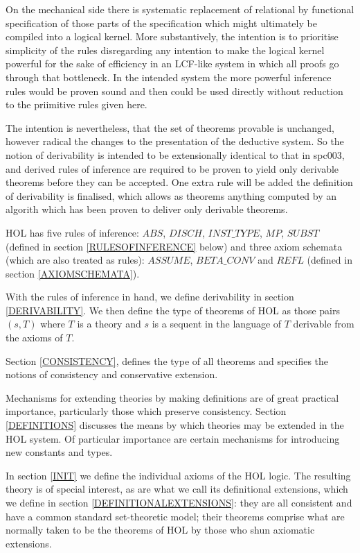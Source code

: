 \documentclass[a4paper,11pt,titlepage]{article}
\begin{document}
\begin{titlepage}
On the mechanical side there is systematic replacement of relational by functional specification of those parts of the specification which might ultimately be compiled into a logical kernel.
More substantively, the intention is to prioritise simplicity of the rules disregarding any intention to make the logical kernel powerful for the sake of efficiency in an LCF-like system in which all proofs go through that bottleneck.
In the intended system the more powerful inference rules would be proven sound and then could be used directly without reduction to the priimitive rules given here.

The intention is nevertheless, that the set of theorems provable is unchanged, however radical the changes to the presentation of the deductive system.
So the notion of derivability is intended to be extensionally identical to that in spc003, and derived rules of inference are required to be proven to yield only derivable theorems before they can be accepted.
One extra rule will be added  the definition of derivability is finalised, which allows as theorems anything computed by an algorith which has been proven to deliver only derivable theorems.

HOL has five rules
of inference: $ABS$, $DISCH$, $INST\_TYPE$, $MP$, $SUBST$
(defined in section \ref{RULESOFINFERENCE} below)
and three axiom schemata (which are also treated as rules): $ASSUME$, $BETA\_CONV$ and $REFL$
(defined in section \ref{AXIOMSCHEMATA}).

With the rules of inference
in hand, we define derivability in section
\ref{DERIVABILITY}.
We then define the type of theorems of HOL as those pairs
$(s, T)$ where $T$ is a theory and $s$ is a sequent in the
language of $T$ derivable from the axioms of $T$.

Section \ref{CONSISTENCY},
defines the type of all theorems and
specifies the notions of consistency and conservative
extension.

Mechanisms for extending theories by
making definitions are of great practical
importance, particularly those which preserve consistency.
Section \ref{DEFINITIONS} discusses
the means by which theories may be extended in the HOL
system. Of particular importance are certain mechanisms
for introducing new constants and types.

In section \ref{INIT} we define the individual axioms
of the HOL logic.
The resulting theory is of special
interest, as are what we call its definitional extensions,
which we define in section \ref{DEFINITIONALEXTENSIONS}:
they are all consistent and have
a common standard set-theoretic model;
their theorems comprise what are normally taken to
be the theorems of HOL by those who shun axiomatic
extensions.


\end{titlepage}
\end{document}
